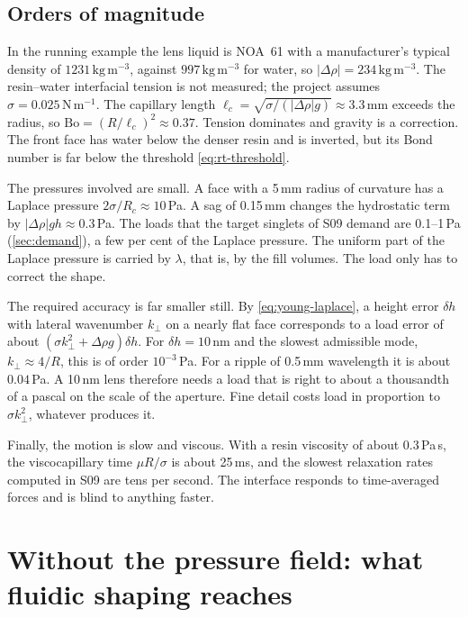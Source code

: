 \documentclass[11pt,a4paper]{article}
\numberwithin{equation}{section}
\begin{document}
\subsection{Orders of magnitude}\label{sec:scales}
In the running example the lens liquid is NOA~61 with a manufacturer's typical
density of $1231\,\mathrm{kg\,m^{-3}}$, against $997\,\mathrm{kg\,m^{-3}}$ for
water, so $|\Delta\rho|=234\,\mathrm{kg\,m^{-3}}$. The resin--water
interfacial tension is not measured; the project assumes
$\sigma=0.025\,\mathrm{N\,m^{-1}}$. The capillary length
$\ell_c=\sqrt{\sigma/(|\Delta\rho|g)}\approx3.3$\,mm exceeds the radius, so
$\mathrm{Bo}=(R/\ell_c)^2\approx0.37$. Tension dominates and gravity is a
correction. The front face has water below the denser resin and is inverted,
but its Bond number is far below the threshold \cref{eq:rt-threshold}.

The pressures involved are small. A face with a 5\,mm radius of curvature has a
Laplace pressure $2\sigma/R_c\approx10$\,Pa. A sag of 0.15\,mm changes the
hydrostatic term by $|\Delta\rho|gh\approx0.3$\,Pa. The loads that the target
singlets of S09 demand are 0.1--1\,Pa (\cref{sec:demand}), a few per cent of the
Laplace pressure. The uniform part of the Laplace pressure is carried by
$\lambda$, that is, by the fill volumes. The load only has to correct the shape.

The required accuracy is far smaller still. By \cref{eq:young-laplace}, a
height error $\delta h$ with lateral wavenumber $k_\perp$ on a nearly flat face
corresponds to a load error of about $(\sigma k_\perp^2+\Delta\rho g)\delta h$.
For $\delta h=10$\,nm and the slowest admissible mode, $k_\perp\approx4/R$,
this is of order $10^{-3}$\,Pa. For a ripple of 0.5\,mm wavelength it is about
$0.04$\,Pa. A 10\,nm lens therefore needs a load that is right to about a
thousandth of a pascal on the scale of the aperture. Fine detail costs load in
proportion to $\sigma k_\perp^2$, whatever produces it.

Finally, the motion is slow and viscous. With a resin viscosity of about
$0.3$\,Pa\,s, the viscocapillary time $\mu R/\sigma$ is about 25\,ms, and the
slowest relaxation rates computed in S09 are tens per second. The interface
responds to time-averaged forces and is blind to anything faster.

\section{Without the pressure field: what fluidic shaping reaches}\label{sec:fluidic}
\end{document}

